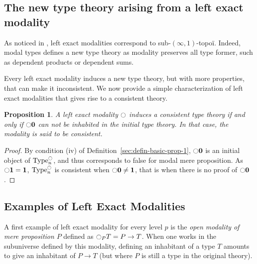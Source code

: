 \documentclass[preprint,9pt,numbers]{sigplanconf}
\newtheorem{prop}[thm]{Proposition}
\newcommand{\mynote}[2]{
    \fbox{\bfseries\sffamily\scriptsize#1}
    {\small$\blacktriangleright$\textsf{\emph{#2}}$\blacktriangleleft$}~}
\newcommand\nt[1]{\mynote{NT}{#1}}
\DeclareMathOperator{\Type}{Type}
\newcommand{\modal}{\ensuremath{\ocircle}}
\newcommand \zero {\mathbf{0}}
\newcommand \one {\mathbf{1}}
\begin{document}
\subsection{The new type theory arising from a left exact modality}
\label{sec:new-type-theory}

As noticed in \cite{hottbook}, left exact modalities correspond
to sub-$(\infty,1)$-topoï. Indeed, modal types defines a new type
theory as modality preserves all type former, such as dependent
products or dependent sums.


Every left exact modality induces a new type theory, but with
more
properties, that can make it inconsistent. We now provide a simple
characterization of left exact modalities that gives rise to a
consistent theory.

\begin{prop}\label{prop:consistent}
  A left exact modality $\modal$ induces a consistent type theory if
  and only if $\modal \zero$ can not be inhabited in the initial type
  theory. In that case, the modality is said to be consistent.
\end{prop}
\begin{proof}
  By condition (iv) of Definition~\ref{sec:defin-basic-prop-1},
  $\modal \zero$ is an initial object of $\Type^\modal_n$, and thus
  corresponds to false for modal mere proposition.
  As $\modal \one = \one$, $\Type^\modal_n$ is consistent when
  $\modal \zero \neq \one$, that is when there is no proof of
  $\modal \zero$.
\end{proof}

\subsection{Examples of Left Exact Modalities}
\label{sec:examples-left-exact}

A first example of left exact modality for every level $p$ is the {\em
  open modality of mere proposition $P$} defined as
$\modal_P T = P \to T$.
%
When one works in
the subuniverse defined by this modality, defining an inhabitant of a
type $T$ amounts to give an inhabitant of $P \to T$ (but where $P$ is
still a type in the original theory).
\end{document}
